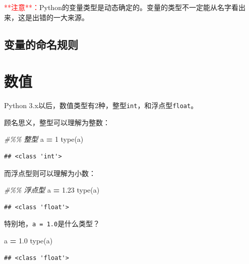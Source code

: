 \documentclass[
]{book}
\newenvironment{Shaded}{\begin{snugshade}}{\end{snugshade}}
\newcommand{\BuiltInTok}[1]{#1}
\newcommand{\CommentTok}[1]{\textcolor[rgb]{0.56,0.35,0.01}{\textit{#1}}}
\newcommand{\DecValTok}[1]{\textcolor[rgb]{0.00,0.00,0.81}{#1}}
\newcommand{\FloatTok}[1]{\textcolor[rgb]{0.00,0.00,0.81}{#1}}
\newcommand{\NormalTok}[1]{#1}
\newcommand{\OperatorTok}[1]{\textcolor[rgb]{0.81,0.36,0.00}{\textbf{#1}}}
\begin{document}
\textcolor{red}{**注意**：}Python的变量类型是动态确定的。变量的类型不一定能从名字看出来，这是出错的一大来源。

\hypertarget{ux53d8ux91cfux7684ux547dux540dux89c4ux5219}{%
\subsection{变量的命名规则}\label{ux53d8ux91cfux7684ux547dux540dux89c4ux5219}}

\hypertarget{ux6570ux503c}{%
\section{数值}\label{ux6570ux503c}}

Python 3.x以后，数值类型有2种，整型\texttt{int}，和浮点型\texttt{float}。

顾名思义，整型可以理解为整数：

\begin{Shaded}
\begin{Highlighting}[]
\CommentTok{\#\%\% 整型}
\NormalTok{a }\OperatorTok{=} \DecValTok{1}
\BuiltInTok{type}\NormalTok{(a)}
\end{Highlighting}
\end{Shaded}

\begin{verbatim}
## <class 'int'>
\end{verbatim}

而浮点型则可以理解为小数：

\begin{Shaded}
\begin{Highlighting}[]
\CommentTok{\#\%\% 浮点型}
\NormalTok{a }\OperatorTok{=} \FloatTok{1.23}
\BuiltInTok{type}\NormalTok{(a)}
\end{Highlighting}
\end{Shaded}

\begin{verbatim}
## <class 'float'>
\end{verbatim}

特别地，\texttt{a\ =\ 1.0}是什么类型？

\begin{Shaded}
\begin{Highlighting}[]
\NormalTok{a }\OperatorTok{=} \FloatTok{1.0}
\BuiltInTok{type}\NormalTok{(a)}
\end{Highlighting}
\end{Shaded}

\begin{verbatim}
## <class 'float'>
\end{verbatim}
\end{document}
